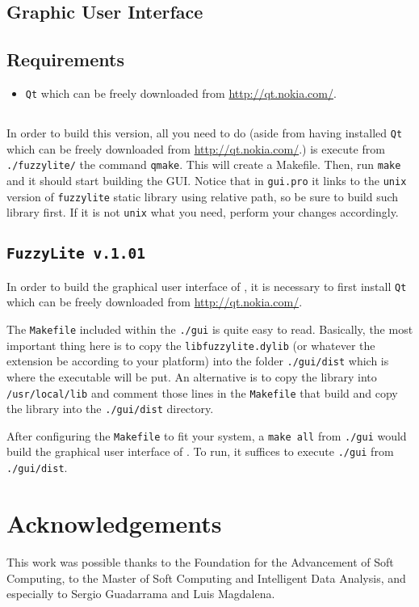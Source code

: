 \subsection{Graphic User Interface}
	\subsection{Requirements}
	\begin{itemize}
	  \item \texttt{Qt} which can be freely downloaded from
	  \url{http://qt.nokia.com/}.
	  
\end{itemize}
	\subsection{\fl}
	In order to build this version, all you need to do (aside from having
	installed \texttt{Qt} which can be freely downloaded from
\url{http://qt.nokia.com/}.) is execute from \texttt{./fuzzylite/} the command
\texttt{qmake}. This will create a Makefile. Then, run \texttt{make} and it
should start building the GUI. Notice that in \texttt{gui.pro} it links
 to the \texttt{unix} version of \texttt{fuzzylite} static library using
 relative path, so be sure to build such library first. If it is not
 \texttt{unix} what you need, perform your changes accordingly.

	\subsection{\texttt{FuzzyLite v.1.01}}
In order to build the graphical user interface of \fl, it is necessary to first
install \texttt{Qt} which can be freely downloaded from
\url{http://qt.nokia.com/}.
	
The \texttt{Makefile} included within the \texttt{./gui} is quite easy to read.
Basically, the most important thing here is to copy the
\texttt{libfuzzylite.dylib} (or whatever the extension be according to your
platform) into the folder \texttt{./gui/dist} which is where the executable will
be put. An alternative is to copy the library into \texttt{/usr/local/lib} and
comment those lines in the \texttt{Makefile} that build and copy the library
into the \texttt{./gui/dist} directory.
	
After configuring the \texttt{Makefile} to fit your system, a \texttt{make all}
from \texttt{./gui} would build the graphical user interface of \fl. To run, it
suffices to execute \texttt{./gui} from \texttt{./gui/dist}.
	
	\section{Acknowledgements}
This work was possible thanks to the Foundation for the Advancement of Soft
Computing, to the Master of Soft Computing and Intelligent Data Analysis, and
especially to Sergio Guadarrama and Luis Magdalena.

